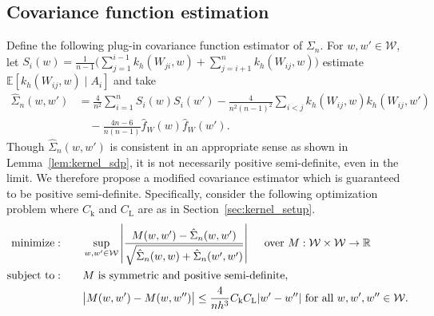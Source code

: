 \documentclass[11pt,lof]{puthesis}
\newcommand{\R}{\ensuremath{\mathbb{R}}}
\newcommand{\E}{\ensuremath{\mathbb{E}}}
\newcommand{\rL}{\ensuremath{\mathrm{L}}}
\newcommand{\rk}{\ensuremath{\mathrm{k}}}
\newcommand{\cW}{\ensuremath{\mathcal{W}}}
\DeclareMathOperator*{\minimize}{minimize:}
\DeclareMathOperator*{\subjectto}{subject\ to:}
\theoremstyle{break}
\theoremstyle{proof}
\begin{document}
\subsection{Covariance function estimation}
\label{sec:kernel_covariance_estimation}

Define the following plug-in covariance function
estimator of $\Sigma_n$. For $w, w' \in \cW$,
let $S_i(w) = \frac{1}{n-1} \big( \sum_{j = 1}^{i-1} k_h(W_{j i}, w)
+ \sum_{j = i+1}^n k_h(W_{i j}, w) \big)$
estimate $\E[k_h(W_{i j},w) \mid A_i]$ and take
%
\begin{align*}
  \hat \Sigma_n(w,w')
  &= \frac{4}{n^2} \sum_{i=1}^n S_i(w) S_i(w')
  - \frac{4}{n^2(n-1)^2} \sum_{i<j} k_h(W_{i j},w) k_h(W_{i j},w') \\
  &\quad- \frac{4n-6}{n(n-1)} \hat f_W(w) \hat f_W(w').
\end{align*}
%
Though $\hat\Sigma_n(w,w')$ is consistent in an appropriate sense as shown in
Lemma~\ref{lem:kernel_sdp}, it is not necessarily positive semi-definite, even
in the limit. We therefore propose a modified covariance estimator which is
guaranteed to be positive semi-definite. Specifically, consider the following
optimization problem where $C_\rk$ and $C_\rL$ are as in
Section~\ref{sec:kernel_setup}.
%
\begin{equation}
  \label{eq:kernel_sdp}
  \begin{aligned}
    \minimize
    \qquad
    & \sup_{w,w' \in \cW}
    \left|
      \frac{M(w,w') - \hat\Sigma_n(w,w')}
      {\sqrt{\hat \Sigma_n(w,w) + \hat \Sigma_n(w',w')}}
    \right|
    \quad \textup{ over } M: \cW \times \cW \to \R
    \\
    \subjectto
    \qquad
    & M \textup{ is symmetric and positive semi-definite}, \\
    & \big|M(w,w') - M(w, w'')\big|
    \leq \frac{4}{n h^3}
    C_\rk C_\rL
    |w'-w''|
    \textup{ for all }
    w, w', w'' \in \cW.
  \end{aligned}
\end{equation}
\end{document}
